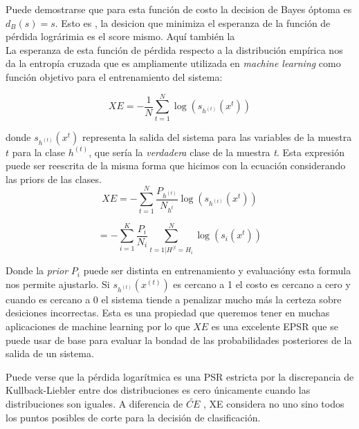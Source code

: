 \documentclass{book}
\begin{document}
Puede demostrarse que para esta función de costo la decision de Bayes óptoma es $d_B(s)=s$. Esto es , la desicion que minimiza el esperanza de la función de pérdida lográrimia es el score mismo. Aquí también la \\
La esperanza de esta función de pérdida respecto a la distribución empírica nos da la entropía cruzada que es ampliamente utilizada en \textit{machine learning} como función objetivo para el entrenamiento del sistema:

\begin{equation}
    XE = -\frac{1}{N}\sum_{t=1}^N \log(s_{h^(t)}(x^{t})) 
\end{equation}

donde $s_{h^(t)}(x^{t})$ representa la salida del sistema para las variables de la muestra $t$ para la clase $h^{(t)}$, que sería la \textit{verdadera} clase de la muestra \textit{t}. Esta expresión puede ser reescrita de la misma forma que hicimos con la ecuación considerando las priors de las clases. 
\begin{equation}
    XE = -\sum_{t=1}^N \frac{P_{h^{(t)}}}{N_{h^{t}}} \log(s_{h^(t)}(x^{t})) 
\end{equation}

\begin{equation}
    = - \sum_{i=1}^{K} \frac{P_i}{N_i} \sum_{t=1|H^{(t}=H_i}^N \log(s_{i}(x^{t})) 
\end{equation}

Donde la \textit{prior} $P_i$ puede ser distinta en entrenamiento y evaluacióny esta formula nos permite ajustarlo. 
Si $ s_{h^{(t)}}(x^{(t)})$ es cercano a 1 el costo es cercano a cero y cuando es cercano a 0 el sistema tiende a penalizar mucho más la certeza sobre desiciones incorrectas. Esta es una propiedad que queremos tener en muchas aplicaciones de machine learning por lo que $XE$ es una excelente EPSR que se puede usar de base para evaluar la bondad de las probabilidades posteriores de la salida de un sistema. 

Puede verse que la pérdida logarítmica es una PSR estricta por la discrepancia de Kullback-Liebler entre dos distribuciones es cero únicamente cuando las distribuciones son iguales. A diferencia de $\widetilde{CE}$ , XE considera no uno sino todos los puntos posibles de corte para la decisión de clasificación. 
\end{document}
